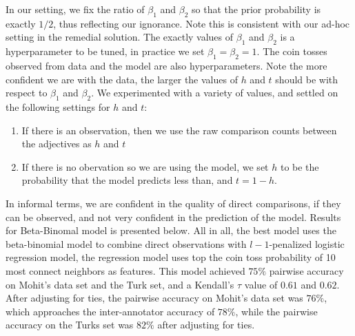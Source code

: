 In our setting, we fix the ratio of $\beta_1$ and $\beta_2$ so that the prior probability is exactly $1/2$, thus reflecting our ignorance. Note this is consistent with our ad-hoc setting in the remedial solution. The exactly values of $\beta_1$ and $\beta_2$ is a hyperparameter to be tuned, in practice we set $\beta_1 = \beta_2 = 1$. The coin tosses observed from data and the model are also hyperparameters. Note the more confident we are with the data, the larger the values of $h$ and $t$ should be with respect to $\beta_1$ and $\beta_2$. We experimented with a variety of values, and settled on the following settings for $h$ and $t$:
	\begin{enumerate}
		\item If there is an observation, then we use the raw comparison counts between the adjectives as $h$ and $t$
		\item If there is no obervation so we are using the model, we set $h$ to be the probability that the model predicts less than, and $t = 1 - h$.
	\end{enumerate}

In informal terms, we are confident in the quality of direct comparisons, if they can be observed, and not very confident in the prediction of the model. Results for Beta-Binomal model is presented below.  All in all, the best model uses the beta-binomial model to combine direct observations with $l-1$-penalized logistic regression model, the regression model uses top the coin toss probability of 10 most connect neighbors as features. This model achieved $75\%$ pairwise accuracy on Mohit's data set and the Turk set, and a Kendall's $\tau$ value of $0.61$ and $0.62$. After adjusting for ties, the pairwise accuracy on Mohit's data set was $76\%$, which approaches the inter-annotator accuracy of $78\%$, while the pairwise accuracy on the Turks set was $82\%$ after adjusting for ties. 

